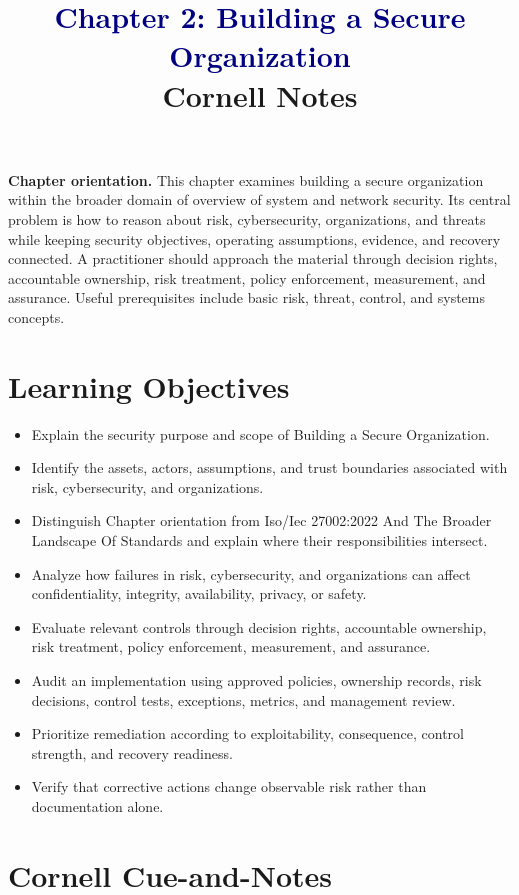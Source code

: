 \documentclass[11pt]{article}
\title{\textcolor{Navy}{Chapter 2: Building a Secure Organization}\\[2mm]\large Cornell Notes}
\author{}
\date{}
\begin{document}
\maketitle
\thispagestyle{fancy}
\vspace{-1.5em}
\begin{orientationbox}
\textbf{Chapter orientation.} This chapter examines building a secure organization within the broader domain of overview of system and network security. Its central problem is how to reason about risk, cybersecurity, organizations, and threats while keeping security objectives, operating assumptions, evidence, and recovery connected. A practitioner should approach the material through decision rights, accountable ownership, risk treatment, policy enforcement, measurement, and assurance. Useful prerequisites include basic risk, threat, control, and systems concepts.
\end{orientationbox}
\section*{Learning Objectives}
\begin{itemize}
\item Explain the security purpose and scope of Building a Secure Organization.
\item Identify the assets, actors, assumptions, and trust boundaries associated with risk, cybersecurity, and organizations.
\item Distinguish Chapter orientation from Iso/Iec 27002:2022 And The Broader Landscape Of Standards and explain where their responsibilities intersect.
\item Analyze how failures in risk, cybersecurity, and organizations can affect confidentiality, integrity, availability, privacy, or safety.
\item Evaluate relevant controls through decision rights, accountable ownership, risk treatment, policy enforcement, measurement, and assurance.
\item Audit an implementation using approved policies, ownership records, risk decisions, control tests, exceptions, metrics, and management review.
\item Prioritize remediation according to exploitability, consequence, control strength, and recovery readiness.
\item Verify that corrective actions change observable risk rather than documentation alone.
\end{itemize}
\section*{Cornell Cue-and-Notes}
\end{document}

